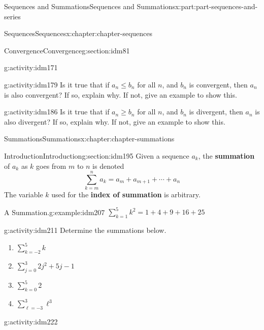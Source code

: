 \documentclass[oneside,10pt,]{book}
\newcommand{\terminology}[1]{\textbf{#1}}
\begin{document}
\begin{partptx}{Sequences and Summations}{}{Sequences and Summations}{}{}{x:part:part-sequences-and-series}
\begin{chapterptx}{Sequences}{}{Sequences}{}{}{x:chapter:chapter-sequences}
\begin{sectionptx}{Convergence}{}{Convergence}{}{}{g:section:idm81}
\begin{activity}{}{g:activity:idm171}
\end{activity}
\begin{activity}{}{g:activity:idm179}%
Is it true that if \(a_n \leq b_n\) for all \(n\), and \(b_n\) is convergent, then \(a_n\) is also convergent? If so, explain why. If not, give an example to show this.%
\end{activity}
\begin{activity}{}{g:activity:idm186}%
Is it true that if \(a_n \geq b_n\) for all \(n\), and \(b_n\) is divergent, then \(a_n\) is also divergent? If so, explain why. If not, give an example to show this.%
\end{activity}
\end{sectionptx}
\end{chapterptx}
%
\typeout{************************************************}
\typeout{************************************************}
%
\begin{chapterptx}{Summations}{}{Summations}{}{}{x:chapter:chapter-summations}
%
%
\typeout{************************************************}
\typeout{************************************************}
%
\begin{sectionptx}{Introduction}{}{Introduction}{}{}{g:section:idm195}
Given a sequence \(a_k\), the \terminology{summation} of \(a_k\) as \(k\) goes from \(m\) to \(n\) is denoted%
\begin{equation*}
\sum_{k=m}^n a_k = a_m + a_{m+1} + \cdots + a_n
\end{equation*}
The variable \(k\) used for the \terminology{index of summation} is arbitrary.%
\begin{example}{A Summation.}{g:example:idm207}%
\(\displaystyle\sum_{k = 1}^5 k^2 = 1 + 4 + 9 + 16 + 25\)%
\end{example}
\begin{activity}{}{g:activity:idm211}%
Determine the summations below.%
\begin{enumerate}[font=\bfseries,label=(\alph*),ref=\alph*]
\item{}\(\displaystyle\sum_{k = -2}^5 k\)\item{}\(\displaystyle\sum_{j = 0}^3 2j^2+5j-1\)\item{}\(\displaystyle\sum_{k = 0}^5 2\)\item{}\(\displaystyle\sum_{\ell = -3}^3 \ell^3\)\end{enumerate}
\end{activity}
\begin{activity}{}{g:activity:idm222}%

\end{activity}
\end{sectionptx}
\end{chapterptx}
\end{partptx}
\end{document}
